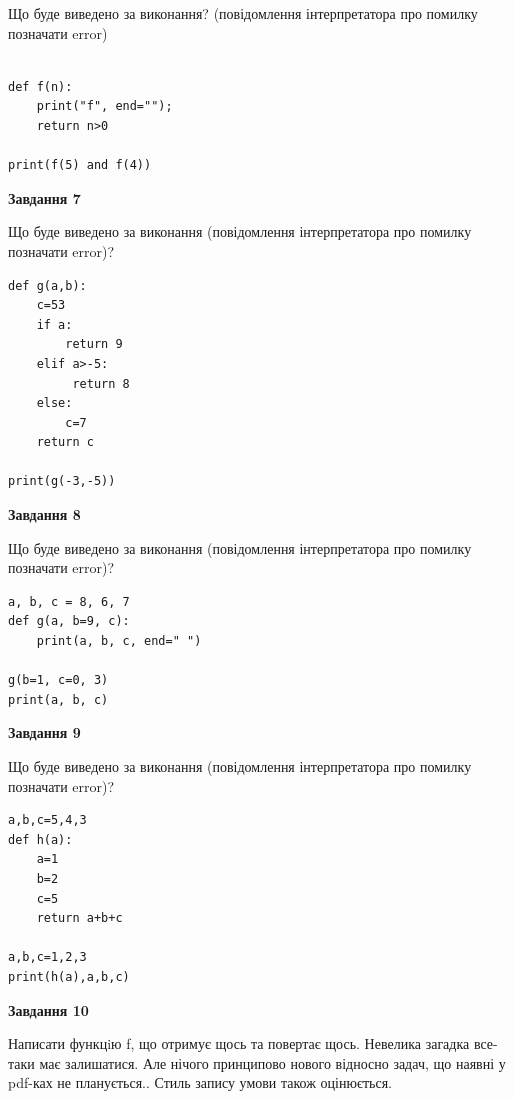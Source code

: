 \documentclass[12pt, ukrainian]{article}
\begin{document}
{\begin {large}
Що буде виведено за виконання? (повідомлення інтерпретатора про помилку позначати error)\par
\begin{verbatim}

def f(n):
    print("f", end="");
    return n>0

print(f(5) and f(4))
\end{verbatim}

{\begin {center}\textbf{Завдання 7}\end {center}}

Що буде виведено за виконання (повідомлення інтерпретатора про помилку позначати error)?\par
\begin{verbatim}
def g(a,b):
    c=53
    if a:
        return 9
    elif a>-5:
         return 8
    else: 
        c=7
    return c

print(g(-3,-5))
\end{verbatim}

{\begin {center}\textbf{Завдання 8}\end {center}}

Що буде виведено за виконання (повідомлення інтерпретатора про помилку позначати error)?\par
\begin{verbatim}
a, b, c = 8, 6, 7
def g(a, b=9, c):
    print(a, b, c, end=" ")

g(b=1, c=0, 3)
print(a, b, c)
\end{verbatim}

{\begin {center}\textbf{Завдання 9}\end {center}}

Що буде виведено за виконання (повідомлення інтерпретатора про помилку позначати error)?\par
\begin{verbatim}
a,b,c=5,4,3
def h(a):
    a=1
    b=2
    c=5
    return a+b+c

a,b,c=1,2,3
print(h(a),a,b,c)
\end{verbatim}

{\begin {center}\textbf{Завдання 10}\end {center}}


Написати функцiю f, що отримує щось та повертає щось. Невелика загадка все-таки має залишатися. Але нічого принципово нового відносно задач, що наявні у pdf-ках не планується.. Стиль запису умови також оцінюється.\par
\end {large}}
\newpage
\end{document}
